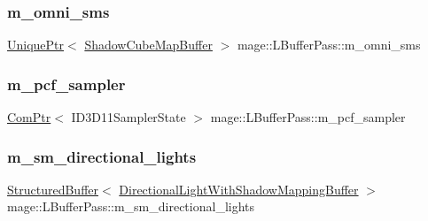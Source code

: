 \hypertarget{structmage_1_1_l_buffer_pass_a083245bbfa560e2e16fd829a30ad857d}{}\label{structmage_1_1_l_buffer_pass_a083245bbfa560e2e16fd829a30ad857d} 
\subsubsection{\texorpdfstring{m\+\_\+omni\+\_\+sms}{m\_omni\_sms}}
{\footnotesize\ttfamily \hyperlink{namespacemage_a3316d7143a973e37adf1110f2e80ca31}{Unique\+Ptr}$<$ \hyperlink{structmage_1_1_shadow_cube_map_buffer}{Shadow\+Cube\+Map\+Buffer} $>$ mage\+::\+L\+Buffer\+Pass\+::m\+\_\+omni\+\_\+sms\hspace{0.3cm}{\ttfamily [private]}}

\hypertarget{structmage_1_1_l_buffer_pass_aaf8dacd30171f31fe2a898fbdd91a990}{}\label{structmage_1_1_l_buffer_pass_aaf8dacd30171f31fe2a898fbdd91a990} 
\subsubsection{\texorpdfstring{m\+\_\+pcf\+\_\+sampler}{m\_pcf\_sampler}}
{\footnotesize\ttfamily \hyperlink{namespacemage_ae74f374780900893caa5555d1031fd79}{Com\+Ptr}$<$ I\+D3\+D11\+Sampler\+State $>$ mage\+::\+L\+Buffer\+Pass\+::m\+\_\+pcf\+\_\+sampler\hspace{0.3cm}{\ttfamily [private]}}

\hypertarget{structmage_1_1_l_buffer_pass_ad9a714aed008db64b5a7d9be1a5f741c}{}\label{structmage_1_1_l_buffer_pass_ad9a714aed008db64b5a7d9be1a5f741c} 
\subsubsection{\texorpdfstring{m\+\_\+sm\+\_\+directional\+\_\+lights}{m\_sm\_directional\_lights}}
{\footnotesize\ttfamily \hyperlink{structmage_1_1_structured_buffer}{Structured\+Buffer}$<$ \hyperlink{structmage_1_1_directional_light_with_shadow_mapping_buffer}{Directional\+Light\+With\+Shadow\+Mapping\+Buffer} $>$ mage\+::\+L\+Buffer\+Pass\+::m\+\_\+sm\+\_\+directional\+\_\+lights\hspace{0.3cm}{\ttfamily [private]}}


